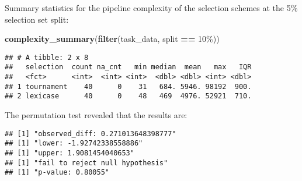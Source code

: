 \documentclass[
]{book}
\newenvironment{Shaded}{\begin{snugshade}}{\end{snugshade}}
\newcommand{\AttributeTok}[1]{\textcolor[rgb]{0.13,0.29,0.53}{#1}}
\newcommand{\DecValTok}[1]{\textcolor[rgb]{0.00,0.00,0.81}{#1}}
\newcommand{\FunctionTok}[1]{\textcolor[rgb]{0.13,0.29,0.53}{\textbf{#1}}}
\newcommand{\NormalTok}[1]{#1}
\newcommand{\OtherTok}[1]{\textcolor[rgb]{0.56,0.35,0.01}{#1}}
\newcommand{\SpecialCharTok}[1]{\textcolor[rgb]{0.81,0.36,0.00}{\textbf{#1}}}
\newcommand{\StringTok}[1]{\textcolor[rgb]{0.31,0.60,0.02}{#1}}
\begin{document}
Summary statistics for the pipeline complexity of the selection schemes at the 5\% selection set split:

\begin{Shaded}
\begin{Highlighting}[]
\FunctionTok{complexity\_summary}\NormalTok{(}\FunctionTok{filter}\NormalTok{(task\_data, split }\SpecialCharTok{==} \StringTok{\textquotesingle{}10\%\textquotesingle{}}\NormalTok{))}
\end{Highlighting}
\end{Shaded}

\begin{verbatim}
## # A tibble: 2 x 8
##   selection  count na_cnt   min median  mean   max   IQR
##   <fct>      <int>  <int> <int>  <dbl> <dbl> <int> <dbl>
## 1 tournament    40      0    31   684. 5946. 98192  900.
## 2 lexicase      40      0    48   469  4976. 52921  710.
\end{verbatim}

The permutation test revealed that the results are:

\begin{Shaded}
\end{Shaded}

\begin{verbatim}
## [1] "observed_diff: 0.271013648398777"
## [1] "lower: -1.92742338558886"
## [1] "upper: 1.9081454040653"
## [1] "fail to reject null hypothesis"
## [1] "p-value: 0.80055"
\end{verbatim}
\end{document}
